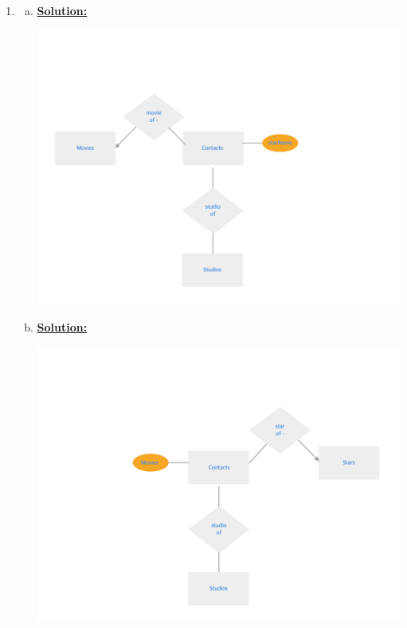 \documentclass[12pt]{article}
\begin{document}
\begin{enumerate}[1.]
    \item

    \begin{enumerate}[a)]
        \item \underline{\textbf{Solution:}}

        \bigskip

        \begin{center}
        \includegraphics[width=\linewidth]{images/worksheet_14_solution_40.png}
        \end{center}

        \item \underline{\textbf{Solution:}}

        \bigskip

        \begin{center}
        \includegraphics[width=\linewidth]{images/worksheet_14_solution_41.png}
        \end{center}


\end{enumerate}
\end{enumerate}
\end{document}
